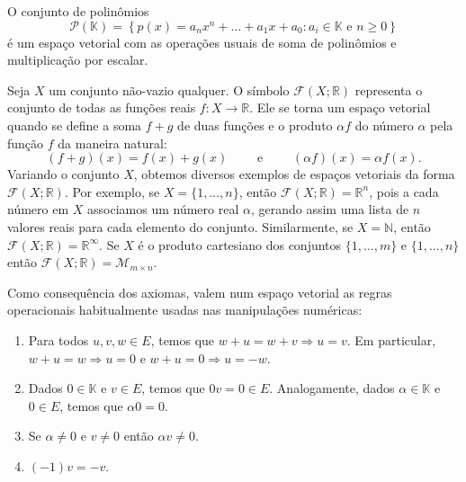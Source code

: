 \begin{exemplo}
  O conjunto de polinômios
  \begin{equation*}
    {\mathcal{P}}({\mathbb{K}}) = \left \{ p(x) = a_nx^n+\ldots+a_1x+a_0 : a_i \in {\mathbb{K}} \text{ e } n\geq 0\right \}
  \end{equation*}
  é um espaço vetorial com as operações usuais de soma de polinômios e multiplicação por escalar. 
\end{exemplo}

\begin{exemplo}
  Seja $X$ um conjunto não-vazio qualquer. O símbolo ${\mathcal{F}}(X;{\mathbb{R}})$ representa o conjunto de todas as funções reais $f:X\rightarrow {\mathbb{R}}$. Ele se torna um espaço vetorial quando se define a soma $f+g$ de duas funções e o produto $\alpha f$ do número $\alpha$ pela função $f$ da maneira natural:
  \begin{equation*}
    (f+g) (x) = f(x) + g(x) \qquad  \mbox{ e } \qquad (\alpha f)(x) = \alpha f(x).
  \end{equation*}
  Variando o conjunto $X$, obtemos diversos exemplos de espaços vetoriais da forma ${\mathcal{F}}(X;{\mathbb{R}})$. Por exemplo, se $X = \{1,\ldots,n\}$, então ${\mathcal{F}}(X;{\mathbb{R}}) = {\mathbb{R}}^n$, pois a cada número em $X$ associamos um número real $\alpha$, gerando assim uma lista de $n$ valores reais para cada elemento do conjunto. Similarmente, se $X={\mathbb{N}}$, então ${\mathcal{F}}(X;{\mathbb{R}}) = {\mathbb{R}}^{\infty}$. Se $X$ é o produto cartesiano dos conjuntos $\{1,\ldots,m\}$ e $\{1,\ldots,n\}$ então ${\mathcal{F}}(X;{\mathbb{R}}) = {\mathcal{M}}_{m\times n}$.
\end{exemplo}

Como consequência dos axiomas, valem num espaço vetorial as regras operacionais habitualmente usadas nas manipulações numéricas:
\begin{enumerate}
\item Para todos $u,v,w \in E$, temos que $w+u = w+v \Rightarrow u=v$. Em particular, $w+u = w \Rightarrow u=0$ e $w+u = 0 \Rightarrow u=-w$.
\item Dados $0\in {\mathbb{K}}$ e $v\in E$, temos que $0v = 0 \in E$. Analogamente, dados $\alpha \in {\mathbb{K}}$ e $0\in E$, temos que $\alpha 0 = 0$.
\item Se $\alpha \ne 0$ e $v\ne 0$ então $\alpha v \ne 0$.
\item $(-1)v = -v$.
\end{enumerate}

